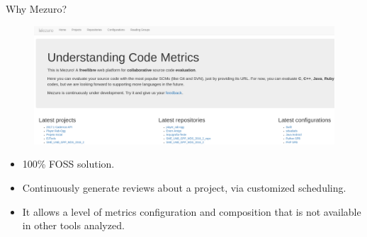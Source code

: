 \begin{block}{Why Mezuro?}
    \begin{figure}
        \begin{center}
            \includegraphics[scale=0.7]{figures/MezuroHome4.png}
            \label{fig:feature1}
        \end{center}
    \end{figure}

    \begin{itemize}
        \item 100\% FOSS solution.

        \item Continuously generate reviews about a project, via customized
            scheduling.

        \item It allows a level of metrics configuration and composition that
            is not available in other tools analyzed.

    \end{itemize}
\end{block}
